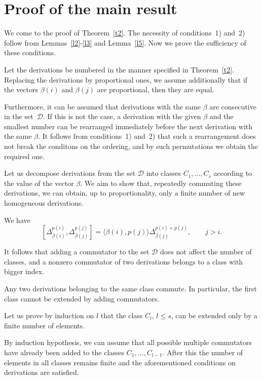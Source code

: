 \documentclass[a4paper, 12pt,oneside,reqno]{amsart}
\numberwithin{equation}{section}
\theoremstyle{definition}
\begin{document}
\section{Proof of the main result}
\label{s3-1}

We come to the proof of Theorem~\ref{t2}. The necessity of conditions~1) and~2) follow from Lemmas~\ref{l2}-\ref{l3} and Lemma~\ref{l5}. Now we prove the sufficiency of these conditions. 

Let the derivations be numbered in the manner specified in Theorem~\ref{t2}. Replacing the derivations by proportional ones, we assume additionally that if the vectors $\beta(i)$ and $\beta(j)$ are proportional, then they are equal. 

Furthermore, it can be assumed that derivations with the same $\beta$ are consecutive in the set~$\mathcal{D}$. If this is not the case, a derivation with the given $\beta$ and the smallest number can be rearranged immediately before the next derivation with the same $\beta$. It follows from conditions~1) and~2) that such a rearrangement does not break the conditons on  the ordering, and by such permutations we obtain the required one.

Let us decompose derivations from the set $\mathcal{D}$ into classes $C_1,\ldots,C_s$ according to the value of the vector $\beta$. We aim to show that, repeatedly commuting these derivations, we can obtain, up to proportionality, only a finite number of new homogeneous derivations.

We have
\[
 \left[\Delta^{p(i)}_{\beta(i)},\Delta^{p(j)}_{\beta(j)}\right]  = \langle\beta(i),p(j)\rangle\Delta^{p(i)+p(j)}_{\beta(j)}, \qquad j>i.
\]

It follows that adding a commutator to the set $\mathcal{D}$ does not affect the number of classes, and a nonzero commutator of two derivations belongs to a class with bigger index.

Any two derivations belonging to the same class commute. In particular, the first class cannot be extended by adding commutators.

Let us prove by induction on $l$ that the class $C_l$, $l \le s$, can be extended only by a finite number of elements. 

By induction hypothesis, we can assume that all possible multiple commutators have already been added to the classes $C_1,\ldots,C_{l-1}$. After this the number of elements in all classes remains finite and the aforementioned conditions on derivations are satisfied. 
\end{document}
